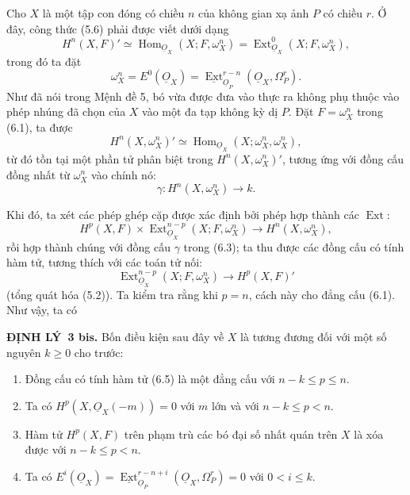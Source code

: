 \documentclass[11pt,twoside,openany]{book}
\numberwithin{equation}{section}
\newcommand{\src}[1]{%
  \phantomsection\hypertarget{src:\fgasourceid:#1}{}%
  \marginpar{\raggedleft\footnotesize\sffamily #1}%
}
\newcommand{\fgasourceid}{unset}
\newcommand{\Osh}{\underline{O}}
\newcommand{\Extsh}{\underline{\operatorname{Ext}}}
\newcommand{\result}[2]{\par\medskip\noindent\textbf{#1\if\relax\detokenize{#2}\relax\else\ #2\fi.}\quad}
\begin{document}
Cho $X$ là một tập con đóng có chiều $n$ của không gian xạ ảnh $P$ có
chiều $r$. Ở đây, công thức (5.6) phải được viết dưới dạng
\begin{equation}\tag{6.1}
  H^{n}(X,F)'
  \simeq\operatorname{Hom}_{\Osh_X}(X;F,\omega_X^{n})
  =\operatorname{Ext}_{\Osh_X}^{0}(X;F,\omega_X^{n}),
\end{equation}
trong đó ta đặt
\begin{equation}\tag{6.2}
  \omega_X^{n}=E^{0}(\Osh_X)
  =\Extsh_{\Osh_P}^{r-n}(\Osh_X,\Omega_P^{r}).
\end{equation}
Như đã nói trong Mệnh đề 5, bó vừa được đưa vào thực ra không phụ thuộc
vào phép nhúng đã chọn của $X$ vào một đa tạp không kỳ dị $P$.
Đặt $F=\omega_X^{n}$ trong (6.1), ta được
\begin{equation}\tag{6.2}
  H^{n}(X,\omega_X^{n})'
  \simeq\operatorname{Hom}_{\Osh_X}(X;\omega_X^{n},\omega_X^{n}),
\end{equation}
 từ đó tồn tại một phần tử
phân biệt trong $H^{n}(X,\omega_X^{n})'$, tương ứng với đồng cấu
đồng nhất từ $\omega_X^{n}$ vào chính nó:
\begin{equation}\tag{6.3}
  \gamma:H^{n}(X,\omega_X^{n})\longrightarrow k.
\end{equation}

\src{186}
Khi đó, ta xét các phép ghép cặp được xác định bởi phép hợp thành các
$\operatorname{Ext}$:
\begin{equation}\tag{6.4}
  H^{p}(X,F)\times
  \operatorname{Ext}_{\Osh_X}^{n-p}(X;F,\omega_X^{n})
  \longrightarrow H^{n}(X,\omega_X^{n}),
\end{equation}
rồi hợp thành chúng với đồng cấu $\gamma$ trong (6.3); ta thu được
các đồng cấu có tính hàm tử, tương thích với các toán tử nối:
\begin{equation}\tag{6.5}
  \operatorname{Ext}_{\Osh_X}^{n-p}(X;F,\omega_X^{n})
  \longrightarrow H^{p}(X,F)'
\end{equation}
(tổng quát hóa (5.2)). Ta kiểm tra rằng khi $p=n$, cách này cho
đẳng cấu (6.1). Như vậy, ta có

\result{ĐỊNH LÝ}{3 bis} Bốn điều kiện sau đây về $X$ là tương đương đối với
một số nguyên $k\geq0$ cho trước:
\begin{enumerate}
  \item[\textit{i.}] Đồng cấu có tính hàm tử (6.5) là một đẳng cấu với
    $n-k\leq p\leq n$.
  \item[\textit{ii.}] Ta có $H^{p}(X,\Osh_X(-m))=0$ với $m$ lớn và với
    $n-k\leq p<n$.
  \item[\textit{iii.}] Hàm tử $H^{p}(X,F)$ trên phạm trù các bó đại số
    nhất quán trên $X$ là xóa được với $n-k\leq p<n$.
  \item[\textit{iv.}] Ta có
    $E^{i}(\Osh_X)=\Extsh_{\Osh_P}^{r-n+i}(\Osh_X,\Omega_P^{r})=0$
    với $0<i\leq k$.
\end{enumerate}
\end{document}

